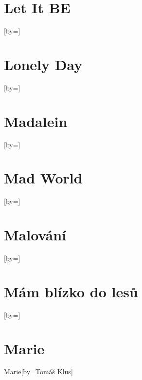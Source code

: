 \documentclass{article}
\begin{document}
\begin{songs}{}
\section{Let It BE}
\begin{song}{}[by={}]
\beginverse

\endverse
\end{song}

\section{Lonely Day}
\begin{song}{}[by={}]
\beginverse

\endverse
\end{song}

\section{Madalein}
\begin{song}{}[by={}]
\beginverse

\endverse
\end{song}

\section{Mad World}
\begin{song}{}[by={}]
\beginverse

\endverse
\end{song}

\section{Malování}
\begin{song}{}[by={}]
\beginverse

\endverse
\end{song}

\section{Mám blízko do lesů}
\begin{song}{}[by={}]
\beginverse

\endverse
\end{song}

\section{Marie}
\begin{song}{Marie}[by={Tomáš Klus}]
\beginverse


\end{song}
\end{songs}
\end{document}
